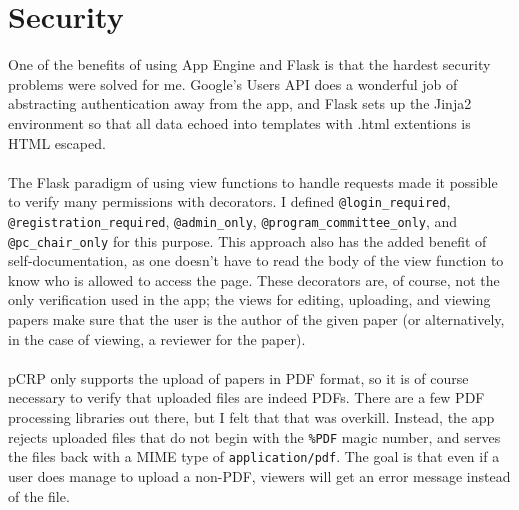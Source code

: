 \documentclass[12pt]{article}
\begin{document}
\section{Security}
	One of the benefits of using App Engine and Flask is that the hardest
	security problems were solved for me. Google's Users API does a
	wonderful job of abstracting authentication away from the app, and
	Flask sets up the Jinja2 environment so that all data echoed into
	templates with .html extentions is HTML escaped.
	\\\\
	The Flask paradigm of using view functions to handle requests made
	it possible to verify many permissions with decorators. I defined
	\texttt{@login\_required}, \texttt{@registration\_required},
	\texttt{@admin\_only}, \texttt{@program\_committee\_only}, and
	\texttt{@pc\_chair\_only} for this purpose. This approach also
	has the added benefit of self-documentation, as one doesn't have
	to read the body of the view function to know who is allowed to
	access the page. These decorators are, of course, not the only
	verification used in the app; the views for editing, uploading, and
	viewing papers make sure that the user is the author of the given paper
	(or alternatively, in the case of viewing, a reviewer for the paper).
	\\\\
	pCRP only supports the upload of papers in PDF format, so it is of
	course necessary to verify that uploaded files are indeed PDFs. There
	are a few PDF processing libraries out there, but I felt that that was
	overkill. Instead, the app rejects uploaded files that do not begin with
	the \texttt{\%PDF} magic number, and serves the files back with a MIME
	type of \texttt{application/pdf}. The goal is that even if a user does
	manage to upload a non-PDF, viewers will get an error message instead of
	the file.
\end{document}
